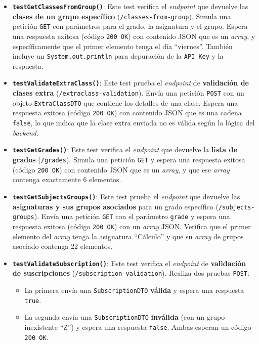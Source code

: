 \begin{itemize}
    \item \textbf{\texttt{testGetClassesFromGroup()}}:
    Este test verifica el \textit{endpoint} que devuelve las \textbf{clases de un grupo específico} (\texttt{/classes-from-group}). Simula una petición \texttt{GET} con parámetros para el grado, la asignatura y el grupo. Espera una respuesta exitosa (código \texttt{200 OK}) con contenido JSON que es un \textit{array}, y específicamente que el primer elemento tenga el día ``viernes''. También incluye un \texttt{System.out.println} para depuración de la \texttt{API Key} y la respuesta.

    \item \textbf{\texttt{testValidateExtraClass()}}:
    Este test prueba el \textit{endpoint} de \textbf{validación de clases extra} (\texttt{/extraclass-validation}). Envía una petición \texttt{POST} con un objeto \texttt{ExtraClassDTO} que contiene los detalles de una clase. Espera una respuesta exitosa (código \texttt{200 OK}) con contenido JSON que es una cadena \texttt{false}, lo que indica que la clase extra enviada no es válida según la lógica del \textit{backend}.

    \item \textbf{\texttt{testGetGrades()}}:
    Este test verifica el \textit{endpoint} que devuelve la \textbf{lista de grados} (\texttt{/grades}). Simula una petición \texttt{GET} y espera una respuesta exitosa (código \texttt{200 OK}) con contenido JSON que es un \textit{array}, y que ese \textit{array} contenga exactamente 6 elementos.

    \item \textbf{\texttt{testGetSubjectsGroups()}}:
    Este test prueba el \textit{endpoint} que devuelve las \textbf{asignaturas y sus grupos asociados} para un grado específico (\texttt{/subjects-groups}). Envía una petición \texttt{GET} con el parámetro \texttt{grade} y espera una respuesta exitosa (código \texttt{200 OK}) con un \textit{array} JSON. Verifica que el primer elemento del \textit{array} tenga la asignatura ``Cálculo'' y que su \textit{array} de grupos asociado contenga 22 elementos.

    \item \textbf{\texttt{testValidateSubscription()}}:
    Este test verifica el \textit{endpoint} de \textbf{validación de suscripciones} (\texttt{/subscription-validation}). Realiza dos pruebas \texttt{POST}:
    \begin{itemize}
        \item La primera envía una \texttt{SubscriptionDTO} \textbf{válida} y espera una respuesta \texttt{true}.
        \item La segunda envía una \texttt{SubscriptionDTO} \textbf{inválida} (con un grupo inexistente ``Z'') y espera una respuesta \texttt{false}. Ambas esperan un código \texttt{200 OK}.
    \end{itemize}


\end{itemize}
